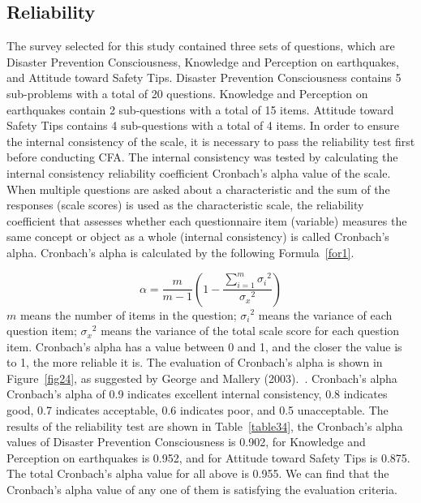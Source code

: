 \subsection{Reliability }



The survey selected for this study contained three sets of questions, which are Disaster Prevention Consciousness, Knowledge and Perception on earthquakes, and Attitude toward Safety Tips. Disaster Prevention Consciousness contains 5 sub-problems with a total of 20 questions. Knowledge and Perception on earthquakes contain 2 sub-questions with a total of 15 items. Attitude toward Safety Tips contains 4 sub-questions with a total of 4 items. In order to ensure the internal consistency of the scale, it is necessary to pass the reliability test first before conducting CFA. The internal consistency was tested by calculating the internal consistency reliability coefficient Cronbach's alpha value of the scale. When multiple questions are asked about a characteristic and the sum of the responses (scale scores) is used as the characteristic scale, the reliability coefficient that assesses whether each questionnaire item (variable) measures the same concept or object as a whole (internal consistency) is called Cronbach's alpha. Cronbach's alpha is calculated by the following Formula~\ref{for1}.

\begin{equation}
\label{for1}
\alpha = \frac{m}{m-1} \left(1 - \frac{\displaystyle \sum_{i = 1}^m{{\sigma_i}^2}}{{\sigma_x}^2} \right)
\end{equation}
$m$ means the number of items in the question; ${\sigma_i}^2$ means the variance of each question item; ${\sigma_x}^2$ means the variance of the total scale score for each question item. Cronbach's alpha has a value between 0 and 1, and the closer the value is to 1, the more reliable it is. The evaluation of Cronbach's alpha is shown in Figure~\ref{fig24}, as suggested by George and Mallery (2003).~\cite{ref1}. Cronbach's alpha  Cronbach's alpha of 0.9 indicates excellent internal consistency, 0.8 indicates good, 0.7 indicates acceptable, 0.6 indicates poor, and 0.5 unacceptable. The results of the reliability test are shown in Table~\ref{table34}, the Cronbach's alpha values of Disaster Prevention Consciousness is 0.902, for Knowledge and Perception on earthquakes is 0.952, and for Attitude toward Safety Tips is 0.875. The total Cronbach's alpha value for all above is 0.955. We can find that the Cronbach's alpha value of any one of them is satisfying the evaluation criteria.




